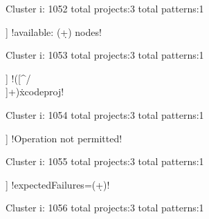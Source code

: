 Cluster i: 1052
total projects:3
total patterns:1
\begin{multicols}{1}
\begin{description}[noitemsep,topsep=0pt]
\item [[3] ] \cverb!available: (\d+) nodes!
\end{description}
\end{multicols}







Cluster i: 1053
total projects:3
total patterns:1
\begin{multicols}{1}
\begin{description}[noitemsep,topsep=0pt]
\item [[3] ] \cverb!([^/\\]+)\.xcodeproj!
\end{description}
\end{multicols}







Cluster i: 1054
total projects:3
total patterns:1
\begin{multicols}{1}
\begin{description}[noitemsep,topsep=0pt]
\item [[3] ] \cverb!Operation not permitted!
\end{description}
\end{multicols}







Cluster i: 1055
total projects:3
total patterns:1
\begin{multicols}{1}
\begin{description}[noitemsep,topsep=0pt]
\item [[3] ] \cverb!expectedFailures=(\d+)!
\end{description}
\end{multicols}







Cluster i: 1056
total projects:3
total patterns:1
\begin{multicols}{1}
\end{multicols}







